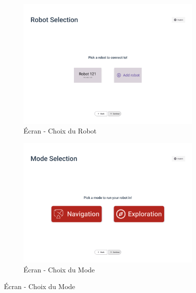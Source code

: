 \begin{figure}[H]
    \centering

    \begin{subfigure}{0.45\linewidth}
        \centering
        \includegraphics[width=\linewidth]{figures//Robot Choice.png}
        \caption{\label{fig:choice_robot} Écran - Choix du Robot}
    \end{subfigure}
    \hfill
    \begin{subfigure}{0.45\linewidth}
        \centering
        \includegraphics[width=\linewidth]{figures//Mode Choice.png}
        \caption{\label{fig:choice_mode} Écran - Choix du Mode}
    \end{subfigure}

    \vspace{0.5cm}


\end{figure}
